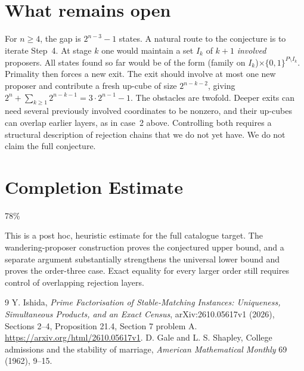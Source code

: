 \documentclass[11pt]{article}
\theoremstyle{definition}
\begin{document}
\section*{What remains open}
For $n\ge4$, the gap is $2^{n-3}-1$ states. A natural route to the conjecture is to iterate Step~4.
At stage $k$ one would maintain a set $I_k$ of $k+1$ \emph{involved} proposers. All states found so far
would be of the form (family on $I_k$)$\times\{0,1\}^{P\setminus I_k}$. Primality then forces a new
exit. The exit should involve at most one new proposer and contribute a fresh up-cube of size $2^{n-k-2}$,
giving $2^n+\sum_{k\ge1}2^{n-k-1}=3\cdot2^{n-1}-1$. The obstacles are twofold. Deeper exits can need
several previously involved coordinates to be nonzero, and their up-cubes can overlap earlier
layers, as in case~2 above. Controlling both requires a structural description of rejection chains that we do not yet
have. We do not claim the full conjecture.

\section{Completion Estimate}
78\%

This is a post hoc, heuristic estimate for the full catalogue target.
The wandering-proposer construction proves the conjectured upper bound, and a separate argument substantially strengthens the universal lower bound and proves the order-three case. Exact equality for every larger order still requires control of overlapping rejection layers.

\begin{thebibliography}{9}
 Y. Ishida, \emph{Prime Factorisation of Stable-Matching Instances: Uniqueness,
Simultaneous Products, and an Exact Census}, arXiv:2610.05617v1 (2026), Sections 2--4, Proposition 21.4, Section 7 problem A.
\url{https://arxiv.org/html/2610.05617v1}.
 D. Gale and L. S. Shapley, College admissions and the stability of marriage,
\emph{American Mathematical Monthly} 69 (1962), 9--15.
\end{thebibliography}
\end{document}

